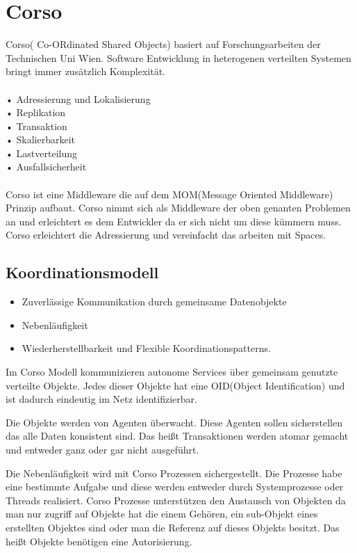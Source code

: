 \documentclass[a4paper,12pt]{scrreprt}
\begin{document}
		\section{Corso} %
			Corso( Co-ORdinated Shared Objects) basiert auf Forschungsarbeiten der Technischen Uni Wien.
			Software Entwicklung in heterogenen verteilten Systemen bringt immer zusätzlich Komplexität.\\\\
			•   Adressierung und Lokalisierung \\
			•	Replikation\\
			•	Transaktion\\
			•	Skalierbarkeit\\
			•	Lastverteilung\\
			•	Ausfallsicherheit\\ \\
			Corso ist eine Middleware die auf dem MOM(Message Oriented Middleware) Prinzip aufbaut. Corso nimmt sich als Middleware der oben genanten Problemen an und erleichtert es dem Entwickler da er sich nicht um diese kümmern muss. Corso erleichtert die Adressierung und vereinfacht das arbeiten mit Spaces.\\
			
			\subsection{Koordinationsmodell}
			
			\begin{itemize}
			\item Zuverlässige Kommunikation durch gemeinsame Datenobjekte
			\item Nebenläufigkeit
			\item Wiederherstellbarkeit und Flexible Koordinationspatterns.
			\end{itemize}
			
			Im Corso Modell kommunizieren autonome Services über gemeinsam genutzte verteilte Objekte. Jedes dieser Objekte hat eine OID(Object Identification) und ist dadurch eindeutig im Netz identifizierbar.
			
			Die Objekte werden von Agenten überwacht. Diese Agenten sollen sicherstellen das alle Daten konsistent sind. Das heißt Transaktionen werden atomar gemacht und entweder ganz oder gar nicht ausgeführt.
			
			Die Nebenläufigkeit wird mit Corso Prozessen sichergestellt. Die Prozesse habe eine bestimmte Aufgabe und diese werden entweder durch Systemprozesse oder Threads realisiert.
			Corso Prozesse unterstützen den Austausch von Objekten da man nur zugriff auf Objekte hat die einem Gehören, ein sub-Objekt eines erstellten Objektes sind oder man die Referenz auf dieses Objekts besitzt.
			Das heißt Objekte benötigen eine Autorisierung.
			
\end{document}
